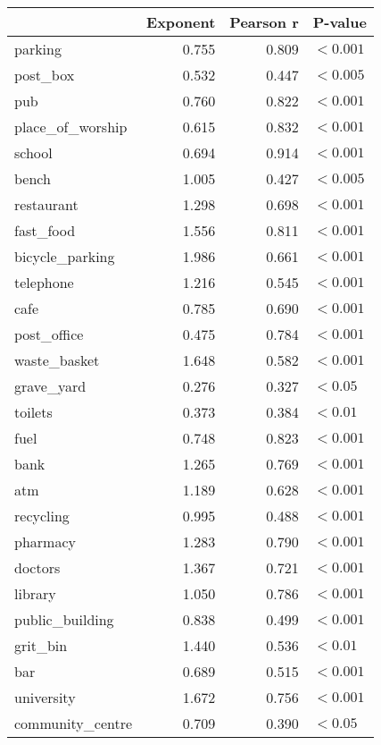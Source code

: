 \begin{tabular}{lrrl}
\toprule
{} &  Exponent &  Pearson r &   P-value \\
\midrule
parking            & 0.755  & 0.809  & $<0.001$ \\  
post\_box          & 0.532  & 0.447  & $<0.005$ \\  
pub                & 0.760  & 0.822  & $<0.001$ \\  
place\_of\_worship & 0.615  & 0.832  & $<0.001$ \\  
school             & 0.694  & 0.914  & $<0.001$ \\  
bench              & 1.005  & 0.427  & $<0.005$ \\  
restaurant         & 1.298  & 0.698  & $<0.001$ \\  
fast\_food         & 1.556  & 0.811  & $<0.001$ \\  
bicycle\_parking   & 1.986  & 0.661  & $<0.001$ \\  
telephone          & 1.216  & 0.545  & $<0.001$ \\  
cafe               & 0.785  & 0.690  & $<0.001$ \\  
post\_office       & 0.475  & 0.784  & $<0.001$ \\  
waste\_basket      & 1.648  & 0.582  & $<0.001$ \\  
grave\_yard        & 0.276  & 0.327  & $<0.05$  \\  
toilets            & 0.373  & 0.384  & $<0.01$  \\  
fuel               & 0.748  & 0.823  & $<0.001$ \\  
bank               & 1.265  & 0.769  & $<0.001$ \\  
atm                & 1.189  & 0.628  & $<0.001$ \\  
recycling          & 0.995  & 0.488  & $<0.001$ \\  
pharmacy           & 1.283  & 0.790  & $<0.001$ \\  
doctors            & 1.367  & 0.721  & $<0.001$ \\  
library            & 1.050  & 0.786  & $<0.001$ \\  
public\_building   & 0.838  & 0.499  & $<0.001$ \\  
grit\_bin          & 1.440  & 0.536  & $<0.01$  \\  
bar                & 0.689  & 0.515  & $<0.001$ \\  
university         & 1.672  & 0.756  & $<0.001$ \\  
community\_centre  & 0.709  & 0.390  & $<0.05$  \\  

\end{tabular}
